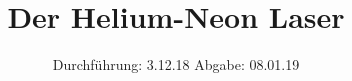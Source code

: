 

\subject{V 61}
\title{Der Helium-Neon Laser}
\date{
  Durchführung: 3.12.18
  \hspace{3em}
  Abgabe: 08.01.19
}



\maketitle
\thispagestyle{empty}
\tableofcontents
\newpage






\printbibliography




